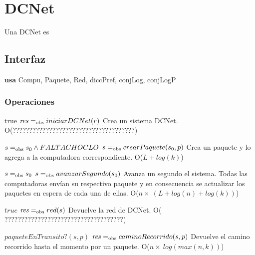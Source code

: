 
\section{DCNet}

Una DCNet es

\subsection{Interfaz}

$\textbf{usa}$  
Compu, Paquete, Red, diccPref, conjLog, conjLogP


\subsubsection*{Operaciones}


 {true}
 {$\text{\textit{res}} =_{\mathrm{obs}} iniciarDCNet(r)$}
 {Crea un sistema DCNet.}
 {O(?????????????????????????????????????)}

 {$s =_{\mathrm{obs}} s_0 \land FALTA CHOCLO$}
 {$s =_{\mathrm{obs}} crearPaquete(s_0, p)$}
 {Crea un paquete y lo agrega a la computadora correspondiente.}
 {O($L + log(k)$)}

 {$s =_{\mathrm{obs}} s_0$}
 {$s =_{\mathrm{obs}} avanzarSegundo(s_0)$}
 {Avanza un segundo el sistema. Todas las computadoras envían su respectivo paquete y en consecuencia se actualizar los paquetes en espera de cada una de ellas.}
 {O($n \times\ (L + log(n) + log(k))$)}

 {$true$}
 {$\text{\textit{res}} =_{\mathrm{obs}} red(s)$}
 {Devuelve la red de DCNet.}
 {O($????????????????????????????????????$)}

 {$paqueteEnTransito?(s,p)$}
 {$\text{\textit{res}} =_{\mathrm{obs}} caminoRecorrido(s,p)$}
 {Devuelve el camino recorrido hasta el momento por un paquete.}
 {O($n \times\  log(max(n,k))$)}

